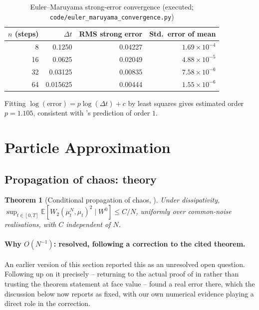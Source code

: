 \documentclass[11pt]{article}
\newtheorem{theorem}{Theorem}[section]
\theoremstyle{remark}
\begin{document}
\begin{table}[ht]
\centering
\caption{Euler--Maruyama strong-error convergence (executed;
\texttt{code/euler\_maruyama\_convergence.py})}
\label{tab:em-results}
\begin{tabular}{rrrr}
\toprule
$n$ (steps) & $\Delta t$ & RMS strong error & Std.\ error of mean \\
\midrule
8   & 0.1250   & 0.04227 & $1.69\times10^{-4}$ \\
16  & 0.0625   & 0.02049 & $4.88\times10^{-5}$ \\
32  & 0.03125  & 0.00835 & $7.58\times10^{-6}$ \\
64  & 0.015625 & 0.00444 & $1.55\times10^{-6}$ \\
\bottomrule
\end{tabular}
\end{table}

Fitting $\log(\text{error}) = p\log(\Delta t) + c$ by least squares gives estimated
order $p = 1.105$, consistent with 's prediction of
order $1$.

\section{Particle Approximation}
\label{sec:particle-approx}

\subsection{Propagation of chaos: theory}

\begin{theorem}[Conditional propagation of chaos, \citealp{monyimba2026thesis}]
\label{thm:poc}
Under dissipativity, $\sup_{t\in[0,T]} \mathbb{E}[W_2(\mu_t^N,\mu_t)^2 \mid W^0]
\le C/N$, uniformly over common-noise realisations, with $C$ independent of $N$.
\end{theorem}

\paragraph{Why $O(N^{-1})$: resolved, following a correction to the cited
theorem.} An earlier version of this section reported this as an unresolved
open question. Following up on it precisely -- returning to the actual proof
of  in \citet{monyimba2026thesis} rather than trusting the
theorem statement at face value -- found a real error there, which the
discussion below now reports as fixed, with our own numerical evidence playing
a direct role in the correction.
\end{document}

